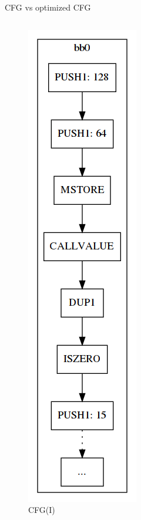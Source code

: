 \documentclass[11pt]{beamer}
\begin{document}
\begin{frame}{CFG vs optimized CFG}
\begin{columns}
\begin{figure}
    \centering
    \includegraphics[scale=0.2]{figures/cfg_normal_1.png}
    \caption{CFG(I)}
\end{figure}
\begin{figure}
    \centering

\end{figure}
\end{columns}
\end{frame}
\end{document}
